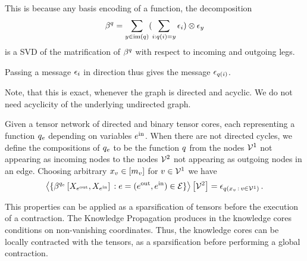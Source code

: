 This is because any basis encoding of a function, the decomposition
\begin{align*}
	\beta^{q} = \sum_{y \in\mathrm{im}\left(q\right)} ( \sum_{i: q(i)=y}\epsilon_{i} )  \otimes \epsilon_{y}
\end{align*}
is a SVD of the matrification of $\beta^{q}$ with respect to incoming and outgoing legs.


Passing a message $\epsilon_{i}$ in direction thus gives the message $\epsilon_{q(i)}$.

Note, that this is exact, whenever the graph is directed and acyclic.
We do not need acyclicity of the underlying undirected graph.



\begin{remark}
	Given a tensor network of directed and binary tensor cores, each representing a function $q_{e}$ depending on variables $e^{\mathrm{in}}$.
	When there are not directed cycles, we define the compositions of $q_{e}$ to be the function $q$ from the nodes $\mathcal{V}^{1}$ not appearing as incoming nodes to the nodes $\mathcal{V}^{2}$ not appearing as outgoing nodes in an edge.
	Choosing arbitrary $x_{v}\in[m_{v}]$ for $v\in\mathcal{V}^{1}$ we have
	\begin{align*}
		\left\langle \{\beta^{q_{e}}\left[X_{e^{\mathrm{out}}},X_{e^{\mathrm{in}}}\right] \, : e=(e^{\mathrm{out}},e^{\mathrm{in}})\in\mathcal{E}\}\right\rangle \left[ \mathcal{V}^{2} \right]
	= \epsilon_{q(x_{v} \, : \, v\in\mathcal{V}^{1})}\, .
	\end{align*}
\end{remark}




This properties can be applied as a sparsification of tensors before the execution of a contraction.
The Knowledge Propagation  produces in the knowledge cores conditions on non-vanishing coordinates.
Thus, the knowledge cores can be locally contracted with the tensors, as a sparsification before performing a global contraction.







